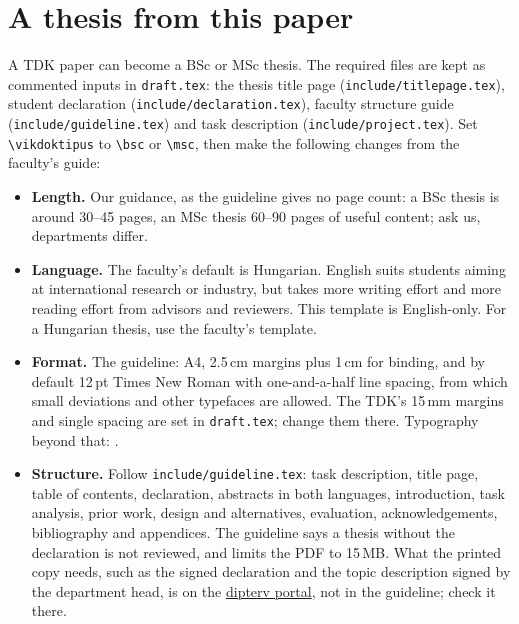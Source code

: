 \section{A thesis from this paper}\label{guide:tdk:thesis}
A TDK paper can become a BSc or MSc thesis. The required files are kept as commented inputs in \texttt{draft.tex}: the thesis title page (\texttt{include/titlepage.tex}), student declaration (\texttt{include/declaration.tex}), faculty structure guide (\texttt{include/guideline.tex}) and task description (\texttt{include/project.tex}). Set \texttt{\textbackslash vikdoktipus} to \texttt{\textbackslash bsc} or \texttt{\textbackslash msc}, then make the following changes from the faculty's guide:
\begin{itemize}[noitemsep]
  \item \textbf{Length.} Our guidance, as the guideline gives no page count: a BSc thesis is around 30--45 pages, an MSc thesis 60--90 pages of useful content; ask us, departments differ.
  \item \textbf{Language.} The faculty's default is Hungarian. English suits students aiming at international research or industry, but takes more writing effort and more reading effort from advisors and reviewers. This template is English-only. For a Hungarian thesis, use the faculty's template.
  \item \textbf{Format.} The guideline: A4, 2.5\,cm margins plus 1\,cm for binding, and by default 12\,pt Times New Roman with one-and-a-half line spacing, from which small deviations and other typefaces are allowed. The TDK's 15\,mm margins and single spacing are set in \texttt{draft.tex}; change them there. Typography beyond that: \citet{guide:Jeney}.
  \item \textbf{Structure.} Follow \texttt{include/guideline.tex}: task description, title page, table of contents, declaration, abstracts in both languages, introduction, task analysis, prior work, design and alternatives, evaluation, acknowledgements, bibliography and appendices. The guideline says a thesis without the declaration is not reviewed, and limits the PDF to 15\,MB. What the printed copy needs, such as the signed declaration and the topic description signed by the department head, is on the \href{https://diplomaterv.vik.bme.hu/}{dipterv portal}, not in the guideline; check it there.
\end{itemize}
